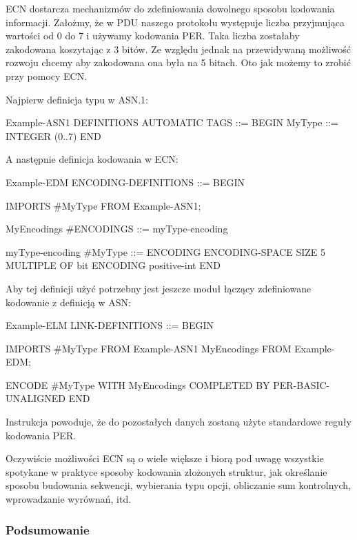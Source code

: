 \documentclass[00-praca-magisterska.tex]{subfiles}
\begin{document}
ECN dostarcza mechanizmów do zdefiniowania dowolnego sposobu kodowania
informacji. Założmy, że w PDU naszego protokołu występuje liczba przyjmująca
wartości od 0 do 7 i używamy kodowania PER. Taka liczba zostałaby zakodowana
koszytając z 3 bitów. Ze względu jednak na przewidywaną możliwość rozwoju
chcemy aby zakodowana ona była na 5 bitach. Oto jak możemy to zrobić przy
pomocy ECN.

Najpierw definicja typu w ASN.1:

\begin{textcode}
  Example-ASN1 DEFINITIONS AUTOMATIC TAGS ::=
  BEGIN
    MyType ::= INTEGER (0..7)
  END
\end{textcode}

A następnie definicja kodowania w ECN:

\begin{textcode}
  Example-EDM ENCODING-DEFINITIONS ::=
  BEGIN
  
  IMPORTS
    #MyType
  FROM Example-ASN1;
  
  MyEncodings #ENCODINGS ::= { myType-encoding }
  
  myType-encoding #MyType ::= {
    ENCODING {
      ENCODING-SPACE
      SIZE 5
      MULTIPLE OF bit
      ENCODING positive-int
    }
  }
  END
\end{textcode}

Aby tej definicji użyć potrzebny jest jeszcze moduł łączący zdefiniowane kodowanie z definicją w ASN:

\begin{textcode}
  Example-ELM LINK-DEFINITIONS ::=
  BEGIN
  
  IMPORTS
    #MyType
  FROM Example-ASN1
    MyEncodings
  FROM Example-EDM;
  
  ENCODE #MyType
    WITH          MyEncodings
    COMPLETED BY  PER-BASIC-UNALIGNED
  END
\end{textcode}

Instrukcja  powoduje, że do pozostałych danych zostaną użyte
standardowe reguły kodowania PER.

Oczywiście możliwości ECN są o wiele większe i biorą pod uwagę wszystkie
spotykane w praktyce sposoby kodowania złożonych struktur, jak określanie
sposobu budowania sekwencji, wybierania typu opcji, obliczanie sum kontrolnych,
wprowadzanie wyrównań, itd.

\subsubsection{Podsumowanie}
\end{document}
